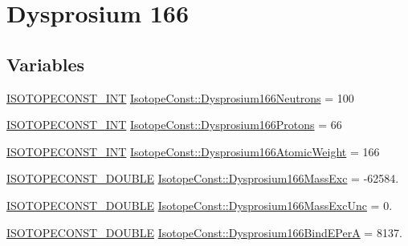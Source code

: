 \hypertarget{group___isotope_const-_dysprosium-_dy166}{}\section{Dysprosium 166}
\label{group___isotope_const-_dysprosium-_dy166}
\subsection*{Variables}
\begin{DoxyCompactItemize}
\item 
\mbox{\hyperlink{group___isotope_const-_macros_ga5f18360b3e99483a35c32d789e62621c}{I\+S\+O\+T\+O\+P\+E\+C\+O\+N\+S\+T\+\_\+\+I\+NT}} \mbox{\hyperlink{group___isotope_const-_dysprosium-_dy166_gab0386f85b496540989c46594e8d2a297}{Isotope\+Const\+::\+Dysprosium166\+Neutrons}} = 100
\item 
\mbox{\hyperlink{group___isotope_const-_macros_ga5f18360b3e99483a35c32d789e62621c}{I\+S\+O\+T\+O\+P\+E\+C\+O\+N\+S\+T\+\_\+\+I\+NT}} \mbox{\hyperlink{group___isotope_const-_dysprosium-_dy166_gab3e3404b127b27e2ebd3857dbc75af5d}{Isotope\+Const\+::\+Dysprosium166\+Protons}} = 66
\item 
\mbox{\hyperlink{group___isotope_const-_macros_ga5f18360b3e99483a35c32d789e62621c}{I\+S\+O\+T\+O\+P\+E\+C\+O\+N\+S\+T\+\_\+\+I\+NT}} \mbox{\hyperlink{group___isotope_const-_dysprosium-_dy166_gaef6f4112f4252069fc16bd16e4e14b8f}{Isotope\+Const\+::\+Dysprosium166\+Atomic\+Weight}} = 166
\item 
\mbox{\hyperlink{group___isotope_const-_macros_ga8f45a7272ce02c0b4c65c44636ed719a}{I\+S\+O\+T\+O\+P\+E\+C\+O\+N\+S\+T\+\_\+\+D\+O\+U\+B\+LE}} \mbox{\hyperlink{group___isotope_const-_dysprosium-_dy166_ga889d6707cf0021d2e6e4bfe7f60dcc26}{Isotope\+Const\+::\+Dysprosium166\+Mass\+Exc}} = -\/62584.
\item 
\mbox{\hyperlink{group___isotope_const-_macros_ga8f45a7272ce02c0b4c65c44636ed719a}{I\+S\+O\+T\+O\+P\+E\+C\+O\+N\+S\+T\+\_\+\+D\+O\+U\+B\+LE}} \mbox{\hyperlink{group___isotope_const-_dysprosium-_dy166_ga6e9a49b70a8284194898ab749fd31a63}{Isotope\+Const\+::\+Dysprosium166\+Mass\+Exc\+Unc}} = 0.
\item 
\mbox{\hyperlink{group___isotope_const-_macros_ga8f45a7272ce02c0b4c65c44636ed719a}{I\+S\+O\+T\+O\+P\+E\+C\+O\+N\+S\+T\+\_\+\+D\+O\+U\+B\+LE}} \mbox{\hyperlink{group___isotope_const-_dysprosium-_dy166_ga3f26a2499c505a4ac21298f8c3a7aad7}{Isotope\+Const\+::\+Dysprosium166\+Bind\+E\+PerA}} = 8137.

\end{DoxyCompactItemize}
